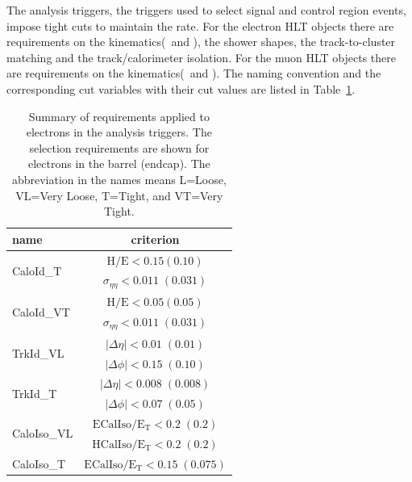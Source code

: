 The analysis triggers, the triggers used to select signal and control region events, 
impose tight cuts to maintain the rate. 
For the electron HLT objects there are requirements on
the kinematics(\pt\ and \Eta), 
the shower shapes, %
the track-to-cluster matching and 
the track/calorimeter isolation. %
For the muon HLT objects there are requirements on 
the kinematics(\pt\ and \Eta). 
The naming convention and the corresponding 
cut variables with their cut values are listed in Table~\ref{tab:trg_requirement_def}.
%
\begin{table}[htp]
 \centering
 \label{tab:trg_requirement_def}
 \vspace{0.5cm}  
 \caption{Summary of requirements applied to electrons in the analysis triggers.
The selection requirements are shown for electrons in the barrel (endcap).
The abbreviation in the names means L=Loose, VL=Very Loose, T=Tight, and VT=Very Tight.}
 \vspace{0.5cm}  
 \begin{tabular}{l|c}
   \hline
   name                       &  criterion \\
   \hline \hline
   \multirow{2}{*}{CaloId\_T} & $\mathrm{H/E < 0.15 (0.10) }$ \\
                               & $\sigma_{\eta\eta}\mathrm{< 0.011\;(0.031)}$ \\
    \hline
   \multirow{2}{*}{CaloId\_VT} & $\mathrm{H/E < 0.05 (0.05) }$ \\
                               & $\sigma_{\eta\eta}\mathrm{< 0.011\;(0.031)}$  \\
    \hline \hline
    \multirow{2}{*}{TrkId\_VL} & $|\Delta\eta|\mathrm{< 0.01\; (0.01)}$ \\
                               & $|\Delta\phi|\mathrm{< 0.15\;(0.10)}$  \\
    \hline
    \multirow{2}{*}{TrkId\_T} & $|\Delta\eta|\mathrm{< 0.008\; (0.008)}$ \\
                              & $|\Delta\phi|\mathrm{< 0.07\;(0.05)}$ \\
    \hline \hline
    \multirow{2}{*}{CaloIso\_VL} & $\mathrm{ECalIso/E_T <0.2\;(0.2)}$ \\
                                 & $\mathrm{HCalIso/E_T <0.2\;(0.2)}$ \\
    \hline
    \multirow{2}{*}{CaloIso\_T} & $\mathrm{ECalIso/E_T <0.15\;(0.075)}$ \\

\end{tabular}
\end{table}
